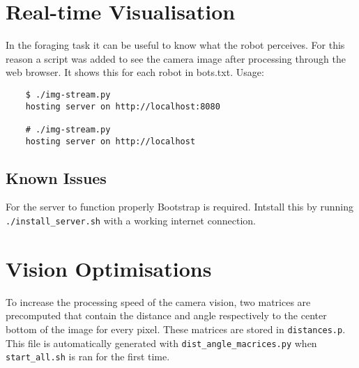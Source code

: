 \documentclass{article}
\begin{document}
	\section{Real-time Visualisation} %
	\label{sec:Real-time Visualisation}
	In the foraging task it can be useful to know what the robot perceives. For
	this reason a script was added to see the camera image after processing
	through the web browser. It shows this for each robot in bots.txt. Usage:
	\begin{verbatim}
	$ ./img-stream.py
	hosting server on http://localhost:8080

	# ./img-stream.py
	hosting server on http://localhost
	\end{verbatim}
	\subsection{Known Issues} %
	\label{sub:Known Issues}
	For the server to function properly Bootstrap is required. Intstall this
	by running \texttt{./install\_server.sh} with a working internet
	connection.

	\section{Vision Optimisations} %
	\label{sec:Vision Optimisations}
	To increase the processing speed of the camera vision, two matrices are
	precomputed that contain the distance and angle respectively to the center
	bottom of the image for every pixel.
	These matrices are stored in \texttt{distances.p}. This file is
	automatically generated with \texttt{dist\_angle\_macrices.py} when
	\texttt{start\_all.sh} is ran for the first time.



\end{document}
